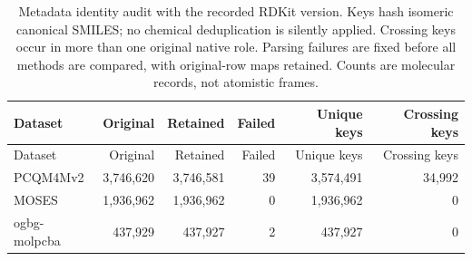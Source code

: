 \begin{longtable}{lrrrrr}
\caption{Metadata identity audit with the recorded RDKit version. Keys hash isomeric canonical SMILES; no chemical deduplication is silently applied. Crossing keys occur in more than one original native role. Parsing failures are fixed before all methods are compared, with original-row maps retained. Counts are molecular records, not atomistic frames.}\\
\toprule
Dataset & Original & Retained & Failed & Unique keys & Crossing keys\\\midrule
\endfirsthead
\toprule
Dataset & Original & Retained & Failed & Unique keys & Crossing keys\\\midrule
\endhead
\midrule\endfoot
\bottomrule\endlastfoot
PCQM4Mv2 & 3,746,620 & 3,746,581 & 39 & 3,574,491 & 34,992\\
MOSES & 1,936,962 & 1,936,962 & 0 & 1,936,962 & 0\\
ogbg-molpcba & 437,929 & 437,927 & 2 & 437,927 & 0\\
\end{longtable}
